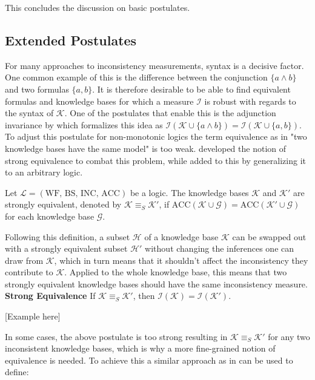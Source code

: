 This concludes the discussion on basic postulates.

\subsection{Extended Postulates}
For many approaches to inconsistency measurements, syntax is a decisive factor. One common example of this is the difference between the conjunction \(\{a \land b\}\) and two formulas \(\{a, b\}\). It is therefore desirable to be able to find equivalent formulas and knowledge bases for which a measure \(\mathcal{I}\) is robust with regards to the syntax of \(\mathcal{K}\). One of the postulates that enable this is the adjunction invariance by \cite{ferme_revisiting_2014} which formalizes this idea as \(\mathcal{I}(\mathcal{K} \cup \{a \land b\}) = \mathcal{I}(\mathcal{K} \cup \{a, b\})\).
To adjust this postulate for non-monotonic logics the term equivalence as in "two knowledge bases have the same model" is too weak. \cite{lifschitz_strongly_2001} developed the notion of strong equivalence to combat this problem, while \cite{brewka_strong_2019} added to this by generalizing it to an arbitrary logic.

\begin{definition}
    Let \(\mathcal{L} = (\text{WF, BS, INC, ACC})\) be a logic. The knowledge bases \(\mathcal{K}\) and \(\mathcal{K}'\) are strongly equivalent, denoted by \(\mathcal{K} \equiv_S  \mathcal{K}'\), if \(\text{ACC}(\mathcal{K} \cup \mathcal{G}) = \text{ACC}(\mathcal{K}' \cup \mathcal{G})\) for each knowledge base \(\mathcal{G}\).
\end{definition}

Following this definition, a subset \(\mathcal{H}\) of a knowledge base \(\mathcal{K}\) can be swapped out with a strongly equivalent subset \(\mathcal{H}'\) without changing the inferences one can draw from \(\mathcal{K}\), which in turn means that it shouldn't affect the inconsistency they contribute to \(\mathcal{K}\). Applied to the whole knowledge base, this means that two strongly equivalent knowledge bases should have the same inconsistency measure.
\\
\textbf{Strong Equivalence}
If \(\mathcal{K} \equiv_S \mathcal{K}'\), then \(\mathcal{I}(\mathcal{K}) = \mathcal{I}(\mathcal{K}')\).

    [Example here]

In some cases, the above postulate is too strong resulting in \(\mathcal{K} \equiv_S \mathcal{K}'\) for any two inconsistent knowledge bases, which is why a more fine-grained notion of equivalence is needed. To achieve this a similar approach as in \cite{thimm_inconsistency_2013} can be used to define:

